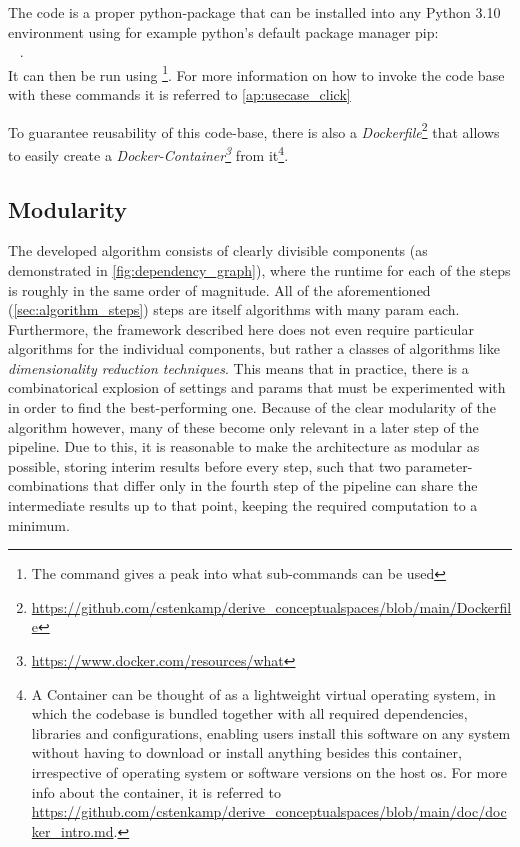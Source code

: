 The code is a proper python-package that can be installed into any Python 3.10 environment using for example python's default package manager pip:\\ ~ .\\ It can then be run using  \footnote{The command  gives a peak into what sub-commands can be used}. For more information on how to invoke the code base with these commands it is referred to \autoref{ap:usecase_click}

To guarantee reusability of this code-base, there is also a \emph{Dockerfile}\footnote{{\url{https://github.com/cstenkamp/derive_conceptualspaces/blob/main/Dockerfile}}} that allows to easily create a \emph{Docker-Container\footnote{\url{https://www.docker.com/resources/what}}} from it\footnote{A Container can be thought of as a lightweight virtual operating system, in which the codebase is bundled together with all required dependencies, libraries and configurations, enabling users install this software on any system without having to download or install anything besides this container, irrespective of operating system or software versions on the host \acrshort{os}. For more info about the container, it is referred to \url{https://github.com/cstenkamp/derive_conceptualspaces/blob/main/doc/docker_intro.md}.}.

\subsection{Modularity}

The developed algorithm consists of clearly divisible components (as demonstrated in \autoref{fig:dependency_graph}), where the runtime for each of the steps is roughly in the same order of magnitude. All of the aforementioned (\autoref{sec:algorithm_steps}) steps are itself algorithms with many \gls{param} each. Furthermore, the framework described here does not even require particular algorithms for the individual components, but rather a classes of algorithms like \emph{dimensionality reduction techniques}. This means that in practice, there is a combinatorical explosion of settings and \glspl{param} that must be experimented with in order to find the best-performing one. Because of the clear modularity of the algorithm however, many of these become only relevant in a later step of the pipeline. Due to this, it is reasonable to make the architecture as modular as possible, storing interim results before every step, such that two parameter-combinations that differ only in \eg the fourth step of the pipeline can share the intermediate results up to that point, keeping the required computation to a minimum. 

